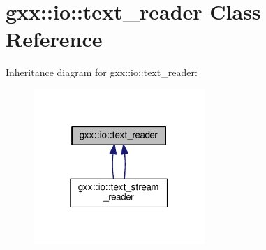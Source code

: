 \hypertarget{classgxx_1_1io_1_1text__reader}{}\section{gxx\+:\+:io\+:\+:text\+\_\+reader Class Reference}
\label{classgxx_1_1io_1_1text__reader}


Inheritance diagram for gxx\+:\+:io\+:\+:text\+\_\+reader\+:
\nopagebreak
\begin{figure}[H]
\begin{center}
\leavevmode
\includegraphics[width=184pt]{classgxx_1_1io_1_1text__reader__inherit__graph}
\end{center}
\end{figure}
